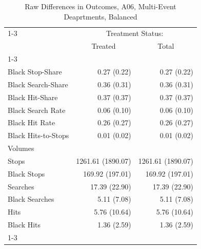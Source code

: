 \begin{table}[!h]
\caption{Raw Differences in Outcomes, A06, Multi-Event Deaprtments, Balanced}
\centering
\begin{tabular}{lll}
\cline{1-3}
\multicolumn{1}{r}{} &
  \multicolumn{2}{c}{Treatment Status:} \\
\multicolumn{1}{r}{} &
  \multicolumn{1}{c}{Treated} &
  \multicolumn{1}{c}{Total} \\
\cline{1-3}
\multicolumn{1}{l}{Rates} &
  \multicolumn{1}{r}{} &
  \multicolumn{1}{r}{} \\
\multicolumn{1}{l}{\hspace{1em}Black Stop-Share} &
  \multicolumn{1}{r}{0.27 (0.22)} &
  \multicolumn{1}{r}{0.27 (0.22)} \\
\multicolumn{1}{l}{\hspace{1em}Black Search-Share} &
  \multicolumn{1}{r}{0.36 (0.31)} &
  \multicolumn{1}{r}{0.36 (0.31)} \\
\multicolumn{1}{l}{\hspace{1em}Black Hit-Share} &
  \multicolumn{1}{r}{0.37 (0.37)} &
  \multicolumn{1}{r}{0.37 (0.37)} \\
\multicolumn{1}{l}{\hspace{1em}Black Search Rate} &
  \multicolumn{1}{r}{0.06 (0.10)} &
  \multicolumn{1}{r}{0.06 (0.10)} \\
\multicolumn{1}{l}{\hspace{1em}Black Hit Rate} &
  \multicolumn{1}{r}{0.26 (0.27)} &
  \multicolumn{1}{r}{0.26 (0.27)} \\
\multicolumn{1}{l}{\hspace{1em}Black Hits-to-Stops} &
  \multicolumn{1}{r}{0.01 (0.02)} &
  \multicolumn{1}{r}{0.01 (0.02)} \\
\multicolumn{1}{l}{Volumes} &
  \multicolumn{1}{r}{} &
  \multicolumn{1}{r}{} \\
\multicolumn{1}{l}{\hspace{1em}Stops} &
  \multicolumn{1}{r}{1261.61 (1890.07)} &
  \multicolumn{1}{r}{1261.61 (1890.07)} \\
\multicolumn{1}{l}{\hspace{1em}Black Stops} &
  \multicolumn{1}{r}{169.92 (197.01)} &
  \multicolumn{1}{r}{169.92 (197.01)} \\
\multicolumn{1}{l}{\hspace{1em}Searches} &
  \multicolumn{1}{r}{17.39 (22.90)} &
  \multicolumn{1}{r}{17.39 (22.90)} \\
\multicolumn{1}{l}{\hspace{1em}Black Searches} &
  \multicolumn{1}{r}{5.11 (7.08)} &
  \multicolumn{1}{r}{5.11 (7.08)} \\
\multicolumn{1}{l}{\hspace{1em}Hits} &
  \multicolumn{1}{r}{5.76 (10.64)} &
  \multicolumn{1}{r}{5.76 (10.64)} \\
\multicolumn{1}{l}{\hspace{1em}Black Hits} &
  \multicolumn{1}{r}{1.36 (2.59)} &
  \multicolumn{1}{r}{1.36 (2.59)} \\
\cline{1-3}
\end{tabular}
\end{table}
